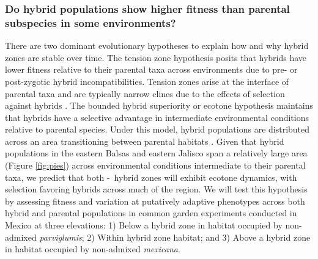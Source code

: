 \subsubsection{Do hybrid populations show higher fitness than parental subspecies in some environments?} 
\label{sss:fitness}

There are two dominant evolutionary hypotheses to explain how and why hybrid zones are stable over time.
The tension zone hypothesis posits that hybrids have lower fitness relative to their parental taxa across environments due to pre- or post-zygotic hybrid incompatibilities.
Tension zones arise at the interface of parental taxa and are typically narrow clines due to the effects of selection against hybrids \citep{abbott2014}.
The bounded hybrid superiority or ecotone hypothesis maintains that hybrids have a selective advantage in intermediate environmental conditions relative to parental species. 
Under this model, hybrid populations are distributed across an area transitioning between parental habitats \citep{abbott2014}.
Given that hybrid populations in the eastern Balsas and eastern Jalisco span a relatively large area (Figure \ref{fig:pies}) across environmental conditions intermediate to their parental taxa, we predict that both \zp-\zm\ hybrid zones will exhibit ecotone dynamics, with selection favoring hybrids across much of the region.
We will test this hypothesis by assessing fitness and variation at putatively adaptive phenotypes across both hybrid and parental populations in common garden experiments conducted in Mexico at three elevations: 1) Below a hybrid zone in habitat occupied by non-admixed \emph{parviglumis}; 2) Within hybrid zone habitat; and 3) Above a hybrid zone in habitat occupied by non-admixed \emph{mexicana}.

